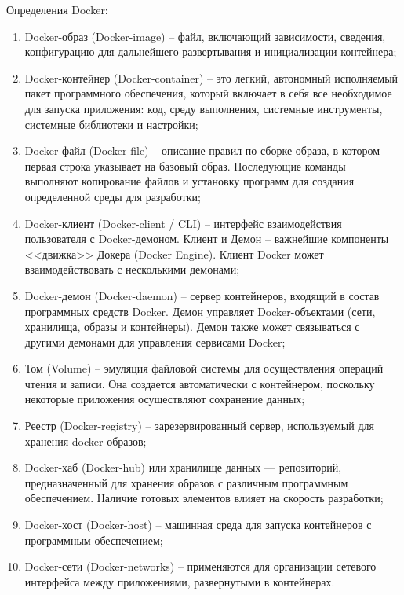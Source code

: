 Определения Docker:
\begin{enumerate}
	\item Docker-образ (Docker-image) -- файл, включающий зависимости, сведения, конфигурацию для дальнейшего развертывания и инициализации контейнера;
	\item Docker-контейнер (Docker-container) -- это легкий, автономный исполняемый пакет программного обеспечения, который включает в себя все необходимое для запуска приложения: код, среду выполнения, системные инструменты, системные библиотеки и настройки;
	\item Docker-файл (Docker-file) -- описание правил по сборке образа, в котором первая строка указывает на базовый образ. Последующие команды выполняют копирование файлов и установку программ для создания определенной среды для разработки;
	\item Docker-клиент (Docker-client / CLI) -- интерфейс взаимодействия пользователя с Docker-демоном. Клиент и Демон -- важнейшие компоненты <<движка>> Докера (Docker Engine). Клиент Docker может взаимодействовать с несколькими демонами;
	\item Docker-демон (Docker-daemon) -- сервер контейнеров, входящий в состав программных средств Docker. Демон управляет Docker-объектами (сети, хранилища, образы и контейнеры). Демон также может связываться с другими демонами для управления сервисами Docker;
	\item Том (Volume) -- эмуляция файловой системы для осуществления операций чтения и записи. Она создается автоматически с контейнером, поскольку некоторые приложения осуществляют сохранение данных;
	\item Реестр (Docker-registry) -- зарезервированный сервер, используемый для хранения docker-образов;
	\item Docker-хаб (Docker-hub) или хранилище данных — репозиторий, предназначенный для хранения образов с различным программным обеспечением. Наличие готовых элементов влияет на скорость разработки;
	\item Docker-хост (Docker-host) -- машинная среда для запуска контейнеров с программным обеспечением;
	\item Docker-сети (Docker-networks) -- применяются для организации сетевого интерфейса между приложениями, развернутыми в контейнерах.
\end{enumerate}
\noteattributes{}

